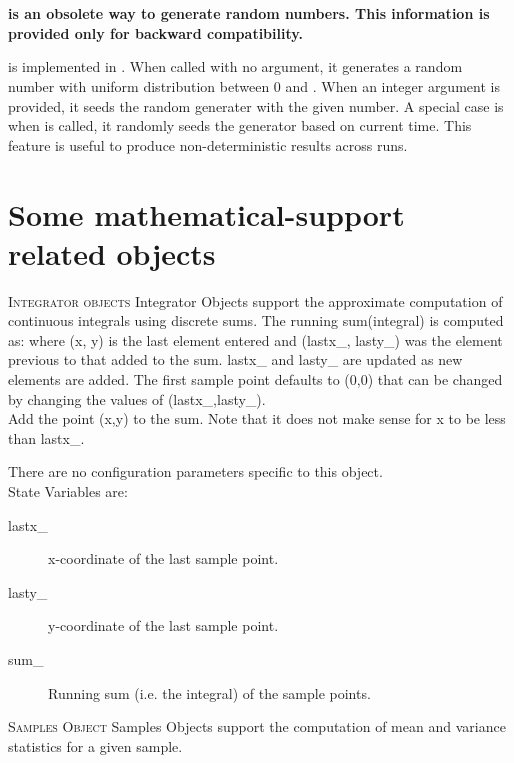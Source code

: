 \section{}

{\bf {} is an obsolete way to generate random numbers. 
This information is provided only for backward compatibility.}

 is implemented in . 
When called with no argument, it generates a random number with
uniform distribution between 0 and .
When an integer argument is provided, it seeds the random generater
with the given number.
A special case is when  is called, it randomly seeds
the generator based on current time.
This feature is useful to produce non-deterministic results across
runs.

\section{Some mathematical-support related objects}
\label{sec:mathobjects}

\textsc{Integrator objects}
Integrator Objects support the approximate computation of continuous
integrals using discrete sums. The running sum(integral) is computed as:
 where (x, y) is the last element
entered and
(lastx\_, lasty\_) was the element previous to that added to the sum.
lastx\_ and lasty\_ are updated as new elements are added. The first
sample point defaults to (0,0) that can be changed by changing the values
of (lastx\_,lasty\_). 
\\ %
Add the point (x,y) to the sum. Note that it does not make sense for x to
be less than lastx\_. 

There are no configuration parameters specific to this object. \\

State Variables are:
\begin{description}
\item[lastx\_]
x-coordinate of the last sample point. 

\item[lasty\_]
y-coordinate of the last sample point. 

\item[sum\_] Running sum (i.e. the integral) of the sample points. 
\end{description}


\textsc{Samples Object}
Samples Objects support the computation of mean and variance statistics
for a given sample. 

